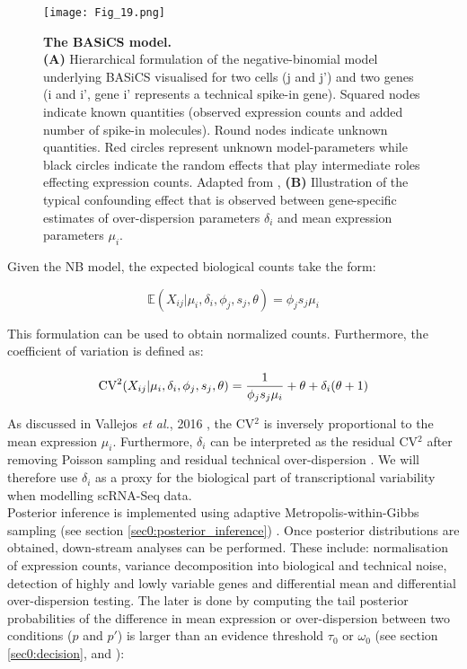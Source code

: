 \newpage

\begin{figure}[!h]
\centering
\texttt{[image: Fig\_19.png]}
\caption[The BASiCS model]{\textbf{The BASiCS model.}\\
\textbf{(A)} Hierarchical formulation of the negative-binomial model underlying BASiCS visualised for two cells (j and j') and two genes (i and i', gene i' represents a technical spike-in gene). Squared nodes indicate known quantities (observed expression counts and added number of spike-in molecules). Round nodes indicate unknown quantities. Red circles represent unknown model-parameters while black circles indicate the random effects that play intermediate roles effecting expression counts. Adapted from \citep{Vallejos2015BASiCS}, \textbf{(B)} Illustration of the typical confounding effect that is observed between gene-specific estimates of over-dispersion parameters $\delta_i$ and mean expression parameters $\mu_i$.}
\label{fig0:BASiCS}
\end{figure}


Given the NB model, the expected biological counts take the form:

\begin{equation}
\mathbb{E}(X_{ij}|\mu_i,\delta_i,\phi_j,s_j,\theta)=\phi_js_j\mu_i
\end{equation}

This formulation can be used to obtain normalized counts. Furthermore, the coefficient of variation is defined as:

\begin{equation}
\textnormal{CV}^2(X_{ij}|\mu_i,\delta_i,\phi_j,s_j,\theta)=\frac{1}{\phi_js_j\mu_i} + \theta + \delta_i(\theta + 1)
\end{equation}

As discussed in Vallejos \emph{et al.}, 2016 \citep{Vallejos2016}, the CV$^2$ is inversely proportional to the mean expression $\mu_i$. Furthermore, $\delta_i$ can be interpreted as the residual CV$^2$ after removing Poisson sampling and residual technical over-dispersion \citep{Vallejos2015BASiCS, Vallejos2016}. We will therefore use $\delta_i$ as a proxy for the biological part of transcriptional variability when modelling scRNA-Seq data.\\

Posterior inference is implemented using adaptive Metropolis-within-Gibbs sampling (see section \ref{sec0:posterior_inference}) \citep{Vallejos2015BASiCS, Vallejos2016}. Once posterior distributions are obtained, down-stream analyses can be performed. These include: normalisation of expression counts, variance decomposition into biological and technical noise, detection of highly and lowly variable genes and differential mean and differential over-dispersion testing. The later is done by computing the tail posterior probabilities of the difference in mean expression or over-dispersion between two conditions ($p$ and $p'$) is larger than an evidence threshold $\tau_0$ or $\omega_0$ (see section \ref{sec0:decision}, and \citep{Bochkina2007, Vallejos2016}):

